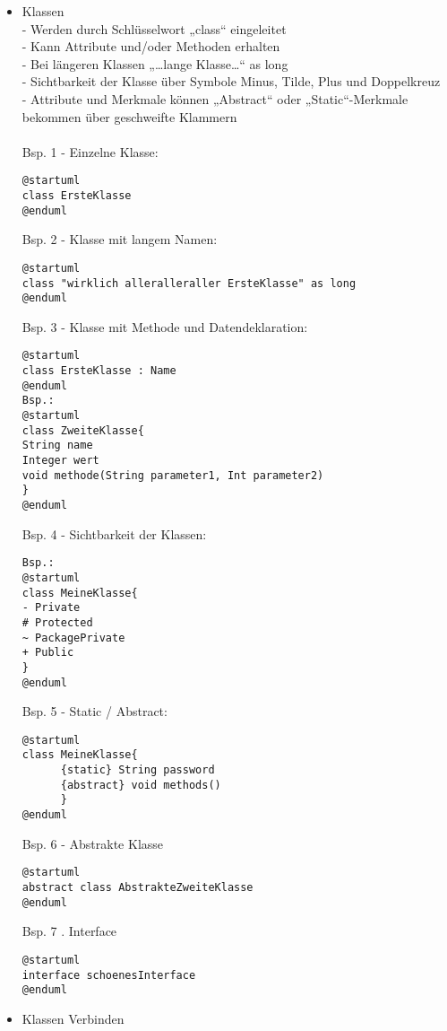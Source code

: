 \begin{itemize}
\item Klassen\\
- Werden durch Schlüsselwort „class“ eingeleitet\\
- Kann Attribute und/oder Methoden erhalten\\
- Bei längeren Klassen „…lange Klasse…“ as long\\
- Sichtbarkeit der Klasse über Symbole Minus, Tilde, Plus und Doppelkreuz\\
- Attribute und Merkmale können „Abstract“ oder „Static“-Merkmale bekommen über geschweifte Klammern\\
\\
Bsp. 1 - Einzelne Klasse:\\
\begin{lstlisting}
@startuml
class ErsteKlasse
@enduml
\end{lstlisting}
Bsp. 2 - Klasse mit langem Namen:\\
\begin{lstlisting}
@startuml
class "wirklich alleralleraller ErsteKlasse" as long
@enduml
\end{lstlisting}
Bsp. 3 - Klasse mit Methode und Datendeklaration:\\
\begin{lstlisting}
@startuml
class ErsteKlasse : Name
@enduml
Bsp.:
@startuml
class ZweiteKlasse{
String name
Integer wert
void methode(String parameter1, Int parameter2)
}
@enduml
\end{lstlisting}
Bsp. 4 - Sichtbarkeit der Klassen:\\
\begin{lstlisting}
Bsp.:
@startuml
class MeineKlasse{
- Private
# Protected
~ PackagePrivate
+ Public
}
@enduml
\end{lstlisting}
Bsp. 5 -  Static / Abstract:\\
\begin{lstlisting}
@startuml
class MeineKlasse{
      {static} String password
      {abstract} void methods()
      }
@enduml
\end{lstlisting}
Bsp. 6 - Abstrakte Klasse\\
\begin{lstlisting}
@startuml
abstract class AbstrakteZweiteKlasse
@enduml
\end{lstlisting}
Bsp. 7 . Interface\\
\begin{lstlisting}
@startuml
interface schoenesInterface
@enduml
\end{lstlisting}
\item Klassen Verbinden\\

\end{itemize}
